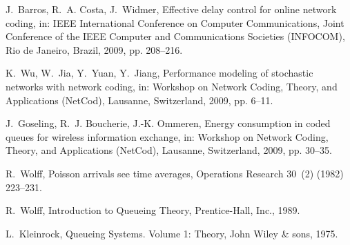 \documentclass[preprint,12pt]{elsarticle}
\theoremstyle{definition}
\theoremstyle{plain}
\theoremstyle{remark}
\begin{document}
\begin{thebibliography}{100}
J.~Barros, R.~A. Costa, J.~Widmer, Effective delay control for online network
  coding, in: IEEE International Conference on Computer Communications, Joint
  Conference of the IEEE Computer and Communications Societies (INFOCOM), Rio
  de Janeiro, Brazil, 2009, pp. 208--216.

K.~Wu, W.~Jia, Y.~Yuan, Y.~Jiang, Performance modeling of stochastic networks
  with network coding, in: Workshop on Network Coding, Theory, and Applications
  (NetCod), Lausanne, Switzerland, 2009, pp. 6--11.

J.~Goseling, R.~J. Boucherie, J.-K. Ommeren, Energy consumption in coded queues
  for wireless information exchange, in: Workshop on Network Coding, Theory,
  and Applications (NetCod), Lausanne, Switzerland, 2009, pp. 30--35.

R.~Wolff, {P}oisson arrivals see time averages, Operations Research 30~(2)
  (1982) 223--231.

R.~Wolff, {I}ntroduction to {Q}ueueing {T}heory, Prentice-Hall, Inc., 1989.

L.~Kleinrock, Queueing Systems. Volume 1: Theory, John Wiley \& sons, 1975.

\end{thebibliography}
\end{document}
